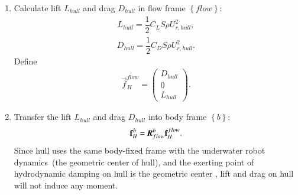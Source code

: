 \begin{enumerate}
\item Calculate lift $L_{hull}$ and drag $D_{hull}$ in flow frame $\left\{ flow \right\}$:
\begin{align}
L_{hull}=\dfrac{1}{2}C_{L}S \rho U_{r,hull}^{2},
\end{align}
\begin{align}
D_{hull}=\dfrac{1}{2}C_{D}S \rho U_{r,hull}^{2}.
\end{align}
Define
\begin{align}
\vec{f}^{flow}_{H}=\begin{pmatrix}
D_{hull}\\0\\L_{hull}
\end{pmatrix}.
\end{align}
\item Transfer the lift $L_{hull}$ and drag $D_{hull}$ into body frame $\left\{ b \right\}$:
\begin{align}
\vec{f}^{b}_{H}=\emph{\textbf{R}}_{flow}^{b}\vec{f}^{flow}_{H}.
\end{align}
Since hull uses the same body-fixed frame with the underwater robot dynamics~(the geometric center of hull), and the exerting point of hydrodynamic damping on hull is the geometric center , lift and drag on hull will not induce any moment.
\end{enumerate}
